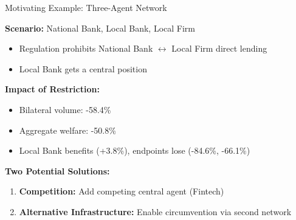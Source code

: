\documentclass[aspectratio=169]{beamer}
\begin{document}
\begin{frame}{Motivating Example: Three-Agent Network}
    
    \textbf{Scenario:} National Bank, Local Bank, Local Firm
    \begin{itemize}
        \item Regulation prohibits National Bank $\leftrightarrow$ Local Firm direct lending
        \item Local Bank gets a central position
    \end{itemize}
    
    \vspace{0.5cm}
    \textbf{Impact of Restriction:}
    \begin{itemize}
        \item Bilateral volume: \textcolor{AlertRed}{-58.4\%}
        \item Aggregate welfare: \textcolor{AlertRed}{-50.8\%}
        \item Local Bank benefits (+3.8\%), endpoints lose (-84.6\%, -66.1\%)
    \end{itemize}
    
    \vspace{0.5cm}
    \textbf{Two Potential Solutions:}
    \begin{enumerate}
        \item \textbf{Competition:} Add competing central agent (Fintech)
        \item \textbf{Alternative Infrastructure:} Enable circumvention via second network
    \end{enumerate}

\end{frame}
\end{document}
